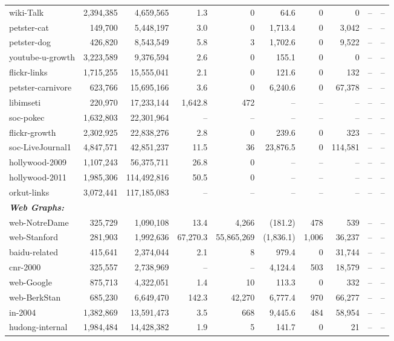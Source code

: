 \documentclass[11pt]{article}
\begin{document}
{\begin{table}[p]
\begin{tabular}{lrr|rr|rrr|rr}
wiki-Talk & 2,394,385 & 4,659,565 & 1.3 & 0 & 64.6 & 0 & 0 & -- & -- \\
petster-cat & 149,700 & 5,448,197 & 3.0 & 0 & 1,713.4 & 0 & 3,042 & -- & -- \\
petster-dog & 426,820 & 8,543,549 & 5.8 & 3 & 1,702.6 & 0 & 9,522 & -- & -- \\
youtube-u-growth & 3,223,589 & 9,376,594 & 2.6 & 0 & 155.1 & 0 & 0 & -- & -- \\
flickr-links & 1,715,255 & 15,555,041 & 2.1 & 0 & 121.6 & 0 & 132 & -- & -- \\
petster-carnivore & 623,766 & 15,695,166 & 3.6 & 0 & 6,240.6 & 0 & 67,378 & -- & -- \\
libimseti & 220,970 & 17,233,144 & 1,642.8 & 472 & -- & -- & -- & -- & -- \\
soc-pokec & 1,632,803 & 22,301,964 & -- & -- & -- & -- & -- & -- & -- \\
flickr-growth & 2,302,925 & 22,838,276 & 2.8 & 0 & 239.6 & 0 & 323 & -- & -- \\
soc-LiveJournal1 & 4,847,571 & 42,851,237 & 11.5 & 36 & 23,876.5 & 0 & 114,581 & -- & -- \\
hollywood-2009 & 1,107,243 & 56,375,711 & 26.8 & 0 & -- & -- & -- & -- & -- \\
hollywood-2011 & 1,985,306 & 114,492,816 & 50.5 & 0 & -- & -- & -- & -- & -- \\
orkut-links & 3,072,441 & 117,185,083 & -- & -- & -- & -- & -- & -- & -- \\
\midrule \multicolumn{4}{l}{\textbf{\textit{Web Graphs:}}} \\
web-NotreDame & 325,729 & 1,090,108 & 13.4 & 4,266 & (181.2) & 478 & 539 & -- & -- \\
web-Stanford & 281,903 & 1,992,636 & 67,270.3 & 55,865,269 & (1,836.1) & 1,006 & 36,237 & -- & -- \\
baidu-related & 415,641 & 2,374,044 & 2.1 & 8 & 979.4 & 0 & 31,744 & -- & -- \\
cnr-2000 & 325,557 & 2,738,969 & -- & -- & 4,124.4 & 503 & 18,579 & -- & -- \\
web-Google & 875,713 & 4,322,051 & 1.4 & 10 & 113.3 & 0 & 332 & -- & -- \\
web-BerkStan & 685,230 & 6,649,470 & 142.3 & 42,270 & 6,777.4 & 970 & 66,277 & -- & -- \\
in-2004 & 1,382,869 & 13,591,473 & 3.5 & 668 & 9,445.6 & 484 & 58,954 & -- & -- \\
hudong-internal & 1,984,484 & 14,428,382 & 1.9 & 5 & 141.7 & 0 & 21 & -- & -- \\

\end{tabular}
\end{table}}
\end{document}
